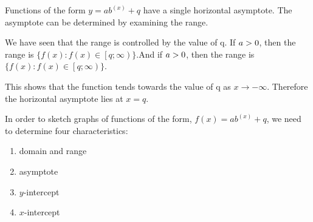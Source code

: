         \label{m39348*uid191}
            \nopagebreak
            \label{m39348*id252384}Functions of the form \begin{math}y=a{b}^{\left(x\right)}+q\end{math} have a single horizontal asymptote. The asymptote can be determined by examining the range.\par 
          \label{m39348*id252423}We have seen that the range is controlled by the value of q. If \begin{math}a>{}0\end{math}, then the range is \begin{math}\{f\left(x\right):f\left(x\right)\in \left[q;\infty \right)\}\end{math}.And if \begin{math}a>{}0\end{math}, then the range is \begin{math}\{f\left(x\right):f\left(x\right)\in \left[q;\infty \right)\}\end{math}.\par 
\label{m39348*id7623}This shows that the function tends towards the value of q as \begin{math}x\to -\infty \end{math}. Therefore the horizontal asymptote lies at \begin{math}x=q\end{math}.
\par 
        
        \label{m39348*uid192}
            \nopagebreak
            
          
          \label{m39348*id252708}In order to sketch graphs of functions of the form, \begin{math}f\left(x\right)=a{b}^{\left(x\right)}+q\end{math}, we need to determine four characteristics:\par 
          \label{m39348*id252753}\begin{enumerate}[noitemsep, label=\textbf{\arabic*}. ] 
            \label{m39348*uid193}\item domain and range
\label{m39348*id64532}\item asymptote
\label{m39348*uid194}\item \begin{math}y\end{math}-intercept
\label{m39348*uid195}\item \begin{math}x\end{math}-intercept
\end{enumerate}
        
